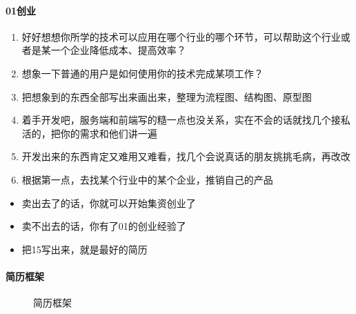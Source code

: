 \documentclass[letterpaper,11pt,english]{sphinxmanual}
\begin{document}
\paragraph{0\sphinxhyphen{}1创业}
\label{\detokenize{chapter_interview/CV:id3}}\begin{enumerate}
%
\item {} 
好好想想你所学的技术可以应用在哪个行业的哪个环节，可以帮助这个行业或者是某一个企业降低成本、提高效率？

\item {} 
想象一下普通的用户是如何使用你的技术完成某项工作？

\item {} 
把想象到的东西全部写出来画出来，整理为流程图、结构图、原型图

\item {} 
着手开发吧，服务端和前端写的糙一点也没关系，实在不会的话就找几个接私活的，把你的需求和他们讲一遍

\item {} 
开发出来的东西肯定又难用又难看，找几个会说真话的朋友挑挑毛病，再改改

\item {} 
根据第一点，去找某个行业中的某个企业，推销自己的产品

\end{enumerate}
\begin{itemize}
\item {} 
卖出去了的话，你就可以开始集资创业了

\item {} 
卖不出去的话，你有了0\sphinxhyphen{}1的创业经验了

\item {} 
把1\sphinxhyphen{}5写出来，就是最好的简历

\end{itemize}


\paragraph{简历框架}
\label{\detokenize{chapter_interview/CV:id4}}
\begin{figure}[H]
\centering
\capstart

\noindent{}
\caption{简历框架}\label{\detokenize{chapter_interview/CV:id9}}\end{figure}
\end{document}
